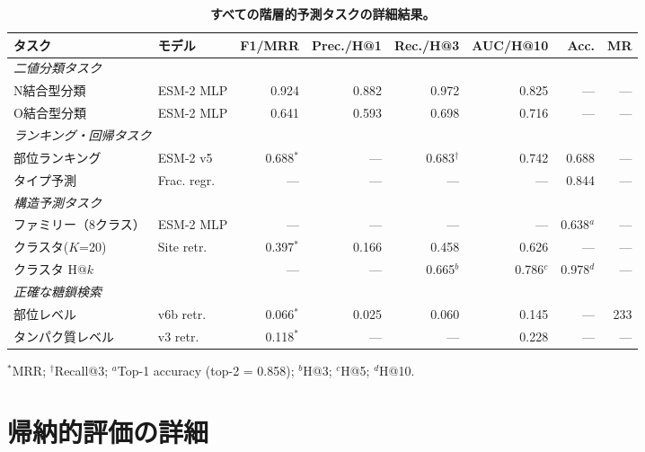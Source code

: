 \documentclass[11pt,a4paper]{ltjsarticle}
\begin{document}
\begin{table}[H]
\centering
\caption{\textbf{すべての階層的予測タスクの詳細結果。}}
\label{tab:detailed_tasks}
\small
\begin{tabular}{llrrrrrr}
\toprule
\textbf{タスク} & \textbf{モデル} & \textbf{F1/MRR} & \textbf{Prec./H@1} & \textbf{Rec./H@3} & \textbf{AUC/H@10} & \textbf{Acc.} & \textbf{MR} \\
\midrule
\multicolumn{8}{l}{\textit{二値分類タスク}} \\
N結合型分類 & ESM-2 MLP & 0.924 & 0.882 & 0.972 & 0.825 & --- & --- \\
O結合型分類 & ESM-2 MLP & 0.641 & 0.593 & 0.698 & 0.716 & --- & --- \\
\midrule
\multicolumn{8}{l}{\textit{ランキング・回帰タスク}} \\
部位ランキング & ESM-2 v5 & 0.688$^*$ & --- & 0.683$^\dagger$ & 0.742 & 0.688 & --- \\
タイプ予測 & Frac. regr. & --- & --- & --- & --- & 0.844 & --- \\
\midrule
\multicolumn{8}{l}{\textit{構造予測タスク}} \\
ファミリー（8クラス） & ESM-2 MLP & --- & --- & --- & --- & 0.638$^a$ & --- \\
クラスタ($K$=20) & Site retr. & 0.397$^*$ & 0.166 & 0.458 & 0.626 & --- & --- \\
\quad クラスタ H@$k$ & & --- & --- & 0.665$^b$ & 0.786$^c$ & 0.978$^d$ & --- \\
\midrule
\multicolumn{8}{l}{\textit{正確な糖鎖検索}} \\
部位レベル & v6b retr. & 0.066$^*$ & 0.025 & 0.060 & 0.145 & --- & 233 \\
タンパク質レベル & v3 retr. & 0.118$^*$ & --- & --- & 0.228 & --- & --- \\
\bottomrule
\end{tabular}

\vspace{0.3em}
\raggedright\scriptsize
$^*$MRR; $^\dagger$Recall@3; $^a$Top-1 accuracy (top-2 = 0.858);
$^b$H@3; $^c$H@5; $^d$H@10.
\end{table}

\section{帰納的評価の詳細}
\label{sec:inductive}
\end{document}
